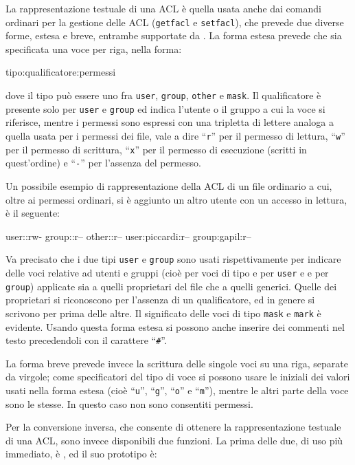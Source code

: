 La rappresentazione testuale di una ACL è quella usata anche dai comandi
ordinari per la gestione delle ACL (\texttt{getfacl} e \texttt{setfacl}), che
prevede due diverse forme, estesa e breve, entrambe supportate da
. La forma estesa prevede che sia specificata una voce
per riga, nella forma:
\begin{Example}
tipo:qualificatore:permessi
\end{Example}
dove il tipo può essere uno fra \texttt{user}, \texttt{group}, \texttt{other}
e \texttt{mask}. Il qualificatore è presente solo per \texttt{user} e
\texttt{group} ed indica l'utente o il gruppo a cui la voce si riferisce,
mentre i permessi sono espressi con una tripletta di lettere analoga a quella
usata per i permessi dei file, vale a dire ``\texttt{r}'' per il permesso di
lettura, ``\texttt{w}'' per il permesso di scrittura, ``\texttt{x}'' per il
permesso di esecuzione (scritti in quest'ordine) e ``\texttt{-}'' per
l'assenza del permesso.

Un possibile esempio di rappresentazione della ACL di un file ordinario a cui,
oltre ai permessi ordinari, si è aggiunto un altro utente con un accesso in
lettura, è il seguente:
\begin{Example}
user::rw-
group::r--
other::r--
user:piccardi:r--
group:gapil:r--
\end{Example}

Va precisato che i due tipi \texttt{user} e \texttt{group} sono usati
rispettivamente per indicare delle voci relative ad utenti e gruppi (cioè per
voci di tipo  e  per \texttt{user} e
 e  per \texttt{group}) applicate sia
a quelli proprietari del file che a quelli generici. Quelle dei proprietari si
riconoscono per l'assenza di un qualificatore, ed in genere si scrivono per
prima delle altre.  Il significato delle voci di tipo \texttt{mask} e
\texttt{mark} è evidente. Usando questa forma estesa si possono anche inserire
dei commenti nel testo precedendoli con il carattere ``\texttt{\#}''.

La forma breve prevede invece la scrittura delle singole voci su una riga,
separate da virgole; come specificatori del tipo di voce si possono usare le
iniziali dei valori usati nella forma estesa (cioè ``\texttt{u}'',
``\texttt{g}'', ``\texttt{o}'' e ``\texttt{m}''), mentre le altri parte della
voce sono le stesse. In questo caso non sono consentiti permessi.

Per la conversione inversa, che consente di ottenere la rappresentazione
testuale di una ACL, sono invece disponibili due funzioni. La prima delle due,
di uso più immediato, è , ed il suo prototipo è:

